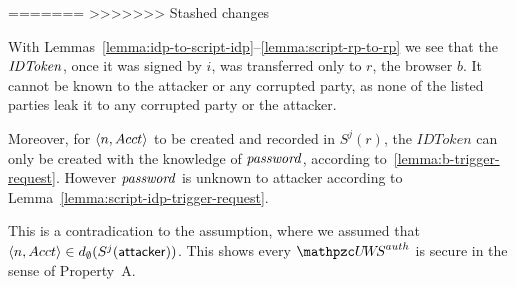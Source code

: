 \begin{theorem}
=======
>>>>>>> Stashed changes
  
  With Lemmas~\ref{lemma:idp-to-script-idp}--\ref{lemma:script-rp-to-rp} we see that the $\mathit{IDToken}$, once it was signed by $i$, was transferred only to $r$, the browser $b$. It cannot be known to the attacker or any corrupted party, as none of the listed parties leak it to any corrupted party or the attacker.

Moreover, for $\langle n,Acct\rangle$ to be created and recorded in $S^j(r)$, the $IDToken$ can only be created with the knowledge of $\mathit{password}$, according to~\ref{lemma:b-trigger-request}. However $\mathit{password}$ is unknown to attacker according to Lemma~\ref{lemma:script-idp-trigger-request}. 

This is a contradication to the assumption, where we assumed that
$\langle n,Acct\rangle \in d_{\emptyset}(S^j(\mathsf{attacker}))$. This shows
every $\uppressoauthwebsystem$ is secure in the sense of Property~A.
  

\end{theorem}

